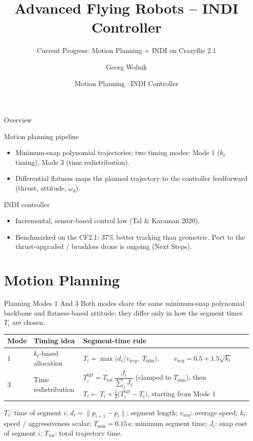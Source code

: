 \documentclass[aspectratio=169,11pt]{beamer}
\title[Advanced Flying Robots -- INDI Controller]{Advanced Flying Robots -- INDI Controller}
\subtitle{Current Progress: Motion Planning + INDI on Crazyflie 2.1}
\author{Georg Wolnik}
\date{Motion Planning \quad--\quad INDI Controller}
\begin{document}
\begin{frame}
  \titlepage
\end{frame}

\begin{frame}{Overview}
\begin{block}{Motion planning pipeline}
\begin{itemize}
  \item Minimum-snap polynomial trajectories; two timing modes: Mode 1 (\(k_t\) timing), Mode 3 (time redistribution).
  \item Differential flatness maps the planned trajectory to the controller feedforward (thrust, attitude, \(\dot\omega_d\)).
\end{itemize}
\end{block}

\begin{block}{INDI controller}
\begin{itemize}
  \item Incremental, sensor-based control law (Tal \& Karaman 2020).
  \item Benchmarked on the CF2.1: 37\% better tracking than geometric. Port to the thrust-upgraded / brushless drone is ongoing (Next Steps).
\end{itemize}
\end{block}
\end{frame}

\section{Motion Planning}

\begin{frame}{Planning Modes 1 And 3}
\small
Both modes share the same minimum-snap polynomial backbone and flatness-based attitude; they differ only in how the segment times \(T_i\) are chosen.

\vspace{0.3cm}
\begin{tabular}{p{}p{}p{}}
\toprule
Mode & Timing idea & Segment-time rule \\
\midrule
1 & \(k_t\)-based allocation & \(T_i=\max\!\big(d_i / v_{avg},\; T_{\min}\big),\qquad v_{avg}=0.5+1.5\sqrt{k_t}\) \\[6pt]
3 & Time redistribution & \(T_i^{\mathrm{tgt}}=T_{\mathrm{tot}}\,\dfrac{J_i}{\sum_j J_j}\) (clamped to \(T_{\min}\)); then \(T_i \leftarrow T_i + \tfrac{1}{2}\big(T_i^{\mathrm{tgt}}-T_i\big)\), starting from Mode 1 \\
\bottomrule
\end{tabular}

\vspace{0.4cm}
{\footnotesize \(T_i\): time of segment \(i\); \(d_i=\|p_{i+1}-p_i\|\): segment length; \(v_{avg}\): average speed; \(k_t\): speed / aggressiveness scalar; \(T_{\min}=0.15\,\)s: minimum segment time; \(J_i\): snap cost of segment \(i\); \(T_{\mathrm{tot}}\): total trajectory time.}
\end{frame}
\end{document}
